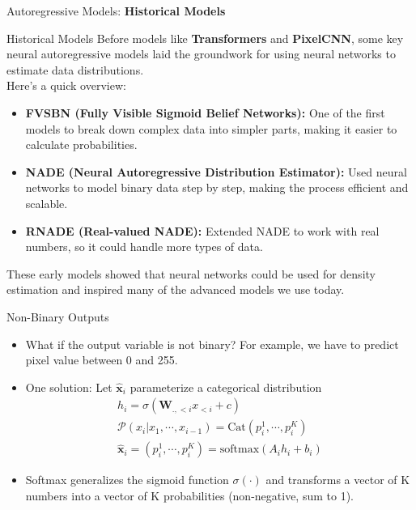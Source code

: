 \begin{frame}[allowframebreaks]{}
    \centering
    \LARGE Autoregressive Models: \textbf{Historical Models}
\end{frame}

\begin{frame}[allowframebreaks]{Historical Models}
    Before models like \textbf{Transformers} and \textbf{PixelCNN}, some key neural autoregressive models laid 
    the groundwork for using neural networks to estimate data distributions. \\
    Here’s a quick overview:

    \begin{itemize}
        \item \textbf{FVSBN (Fully Visible Sigmoid Belief Networks):} 
        One of the first models to break down complex data into simpler parts, making it easier to calculate probabilities.
        \item \textbf{NADE (Neural Autoregressive Distribution Estimator):} 
        Used neural networks to model binary data step by step, making the process efficient and scalable.
        \item \textbf{RNADE (Real-valued NADE):} 
        Extended NADE to work with real numbers, so it could handle more types of data.
    \end{itemize}

    These early models showed that neural networks could be used for density estimation and inspired many of the advanced models we use today.
\end{frame}




\begin{frame}{Non-Binary Outputs}
    \begin{itemize}
        \item What if the output variable is not binary? For example, we have to predict pixel value between 0 and 255.
        \item One solution: Let $\mathbf{\hat{x}}_i$ parameterize a categorical distribution
        \begin{align}
            h_i = \sigma(\mathbf{W}_{.,<i} x_{<i} + c)\\
            \mathcal{P}(x_i | x_1, \cdots, x_{i-1}) = \text{Cat}(p_i^1, \cdots, p_i^K)\\
            \mathbf{\hat{x}}_i = (p_i^1, \cdots, p_i^K) = \text{softmax} (A_i h_i + b_i)
        \end{align}
        \item Softmax generalizes the sigmoid function $\sigma(\cdot)$ and transforms a vector of K numbers into a vector of K probabilities (non-negative, sum to 1).

    \end{itemize}
\end{frame}



